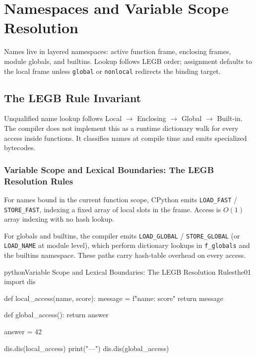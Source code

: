 \documentclass[a4paper,twoside]{report}
\begin{document}
\section{Namespaces and Variable Scope Resolution}

Names live in layered namespaces: active function frame, enclosing frames, module globals, and builtins. Lookup follows LEGB order; assignment defaults to the local frame unless \texttt{global} or \texttt{nonlocal} redirects the binding target.


\subsection{The LEGB Rule Invariant}

Unqualified name lookup follows Local $\rightarrow$ Enclosing $\rightarrow$ Global $\rightarrow$ Built-in. The compiler does not implement this as a runtime dictionary walk for every access inside functions. It classifies names at compile time and emits specialized bytecodes.

\subsubsection{Variable Scope and Lexical Boundaries: The LEGB Resolution Rules}

For names bound in the current function scope, CPython emits \texttt{LOAD\_FAST} / \texttt{STORE\_FAST}, indexing a fixed array of local slots in the frame. Access is $O(1)$ array indexing with no hash lookup.

For globals and builtins, the compiler emits \texttt{LOAD\_GLOBAL} / \texttt{STORE\_GLOBAL} (or \texttt{LOAD\_NAME} at module level), which perform dictionary lookups in \texttt{f\_globals} and the builtins namespace. These paths carry hash-table overhead on every access.

\begin{codebox}[]{python}{Variable Scope and Lexical Boundaries: The LEGB Resolution Rules}{the01}
import dis

def local_access(name, score):
    message = f"{name}: {score}"
    return message

def global_access():
    return answer

answer = 42

dis.dis(local_access)
print("---")
dis.dis(global_access)
\end{codebox}
\end{document}
